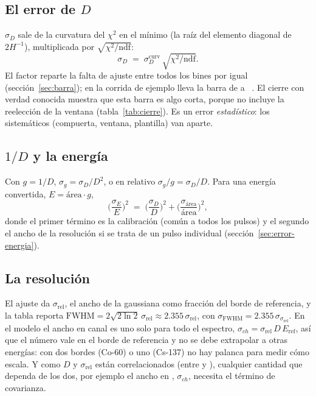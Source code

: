 \documentclass[11pt,a4paper]{article}
\begin{document}
\subsection{El error de $D$}

$\sigma_D$ sale de la curvatura del $\chi^2$ en el mínimo (la raíz del
elemento diagonal de $2H^{-1}$), multiplicada por $\sqrt{\chi^2/\text{ndf}}$:
\[
   \sigma_D \;=\; \sigma_D^{\text{curv}}\,\sqrt{\chi^2/\text{ndf}} .
\]
El factor reparte la falta de ajuste entre todos los bines por igual
(sección~\ref{sec:barra}); en la corrida de ejemplo lleva la barra de
\EjErrCurv{} a \EjErrEscalado~\DkeV. El cierre con verdad conocida muestra que
esta barra es algo corta, porque no incluye la reelección de la ventana
(tabla~\ref{tab:cierre}). Es un error \emph{estadístico}: los sistemáticos
(compuerta, ventana, plantilla) van aparte.

\subsection{$1/D$ y la energía}

Con $g = 1/D$, $\sigma_g = \sigma_D/D^2$, o en relativo
$\sigma_g/g = \sigma_D/D$. Para una energía convertida, $E = \text{área}\cdot g$,
\[
   \Big(\frac{\sigma_E}{E}\Big)^2 \;=\; \Big(\frac{\sigma_D}{D}\Big)^2
   + \Big(\frac{\sigma_{\text{área}}}{\text{área}}\Big)^2 ,
\]
donde el primer término es la calibración (común a todos los pulsos) y el
segundo el ancho de la resolución si se trata de un pulso individual
(sección~\ref{sec:error-energia}).

\subsection{La resolución}

El ajuste da $\sigma_{\text{rel}}$, el ancho de la gaussiana como fracción del
borde de referencia, y la tabla reporta
$\text{FWHM} = 2\sqrt{2\ln 2}\,\sigma_{\text{rel}} \approx 2.355\,\sigma_{\text{rel}}$,
con $\sigma_{\text{FWHM}} = 2.355\,\sigma_{\sigma_{\text{rel}}}$. En el modelo
el ancho en canal es uno solo para todo el espectro,
$\sigma_{ch} = \sigma_{\text{rel}}\,D\,E_{\text{ref}}$, así que el número vale
en el borde de referencia y no se debe extrapolar a otras energías: con dos
bordes (Co-60) o uno (Cs-137) no hay palanca para medir cómo escala. Y como
$D$ y $\sigma_{\text{rel}}$ están correlacionados (entre \CorrMin{} y
\CorrMax), cualquier cantidad que dependa de los dos, por ejemplo el ancho en
\mVns, $\sigma_{ch}$, necesita el término de covarianza.
\end{document}
